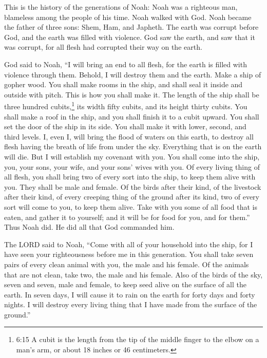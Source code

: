 \myverse{}This is the history of the generations of Noah: Noah was a righteous man, blameless among the people of his time. Noah walked with God.  \myverse{}Noah became the father of three sons: Shem, Ham, and Japheth.  \myverse{}The earth was corrupt before God, and the earth was filled with violence.  \myverse{}God saw the earth, and saw that it was corrupt, for all flesh had corrupted their way on the earth.

\myverse{}God said to Noah, “I will bring an end to all flesh, for the earth is filled with violence through them. Behold, I will destroy them and the earth.  \myverse{}Make a ship of gopher wood. You shall make rooms in the ship, and shall seal it inside and outside with pitch.  \myverse{}This is how you shall make it. The length of the ship shall be three hundred cubits,\footnote{6:15 A cubit is the length from the tip of the middle finger to the elbow on a man’s arm, or about 18 inches or 46 centimeters.} its width fifty cubits, and its height thirty cubits.  \myverse{}You shall make a roof in the ship, and you shall finish it to a cubit upward. You shall set the door of the ship in its side. You shall make it with lower, second, and third levels.  \myverse{}I, even I, will bring the flood of waters on this earth, to destroy all flesh having the breath of life from under the sky. Everything that is on the earth will die.  \myverse{}But I will establish my covenant with you. You shall come into the ship, you, your sons, your wife, and your sons’ wives with you.  \myverse{}Of every living thing of all flesh, you shall bring two of every sort into the ship, to keep them alive with you. They shall be male and female.  \myverse{}Of the birds after their kind, of the livestock after their kind, of every creeping thing of the ground after its kind, two of every sort will come to you, to keep them alive.  \myverse{}Take with you some of all food that is eaten, and gather it to yourself; and it will be for food for you, and for them.”  \myverse{}Thus Noah did. He did all that God commanded him.

\mychapter{}
\myverse*{}The LORD said to Noah, “Come with all of your household into the ship, for I have seen your righteousness before me in this generation. \myverse{}You shall take seven pairs of every clean animal with you, the male and his female. Of the animals that are not clean, take two, the male and his female. \myverse{}Also of the birds of the sky, seven and seven, male and female, to keep seed alive on the surface of all the earth. \myverse{}In seven days, I will cause it to rain on the earth for forty days and forty nights. I will destroy every living thing that I have made from the surface of the ground.”

